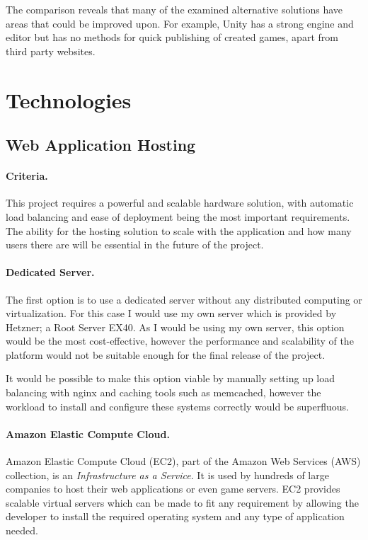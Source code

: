 The comparison reveals that many of the examined alternative solutions have areas that could be improved upon. For example, Unity has a strong engine and editor but has no methods for quick publishing of created games, apart from third party websites.

\section{Technologies}
\subsection{Web Application Hosting}
\paragraph{Criteria.}
This project requires a powerful and scalable hardware solution, with automatic load balancing and ease of deployment being the most important requirements. The ability for the hosting solution to scale with the application and how many users there are will be essential in the future of the project.

\paragraph{Dedicated Server.}
The first option is to use a dedicated server without any distributed computing or virtualization. For this case I would use my own server which is provided by Hetzner; a Root Server EX40. As I would be using my own server, this option would be the most cost-effective, however the performance and scalability of the platform would not be suitable enough for the final release of the project.

It would be possible to make this option viable by manually setting up load balancing with nginx and caching tools such as memcached, however the workload to install and configure these systems correctly would be superfluous.\cite{nginxloadbalancing,memcached}

\paragraph{Amazon Elastic Compute Cloud.}
Amazon Elastic Compute Cloud (EC2), part of the Amazon Web Services (AWS) collection, is an \emph{Infrastructure as a Service}.\cite{awsec2} It is used by hundreds of large companies to host their web applications or even game servers. EC2 provides scalable virtual servers which can be made to fit any requirement by allowing the developer to install the required operating system and any type of application needed.

